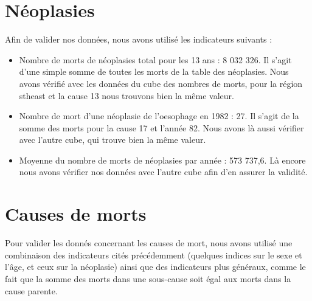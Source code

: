\section{Néoplasies}
Afin de valider nos données, nous avons utilisé les indicateurs suivants :
\begin{itemize}
    \item Nombre de morts de néoplasies total pour les 13 ans : 8 032 326. Il s'agit d'une simple somme de toutes les morts de la table des néoplasies. Nous avons vérifié avec les données du cube des nombres de morts, pour la région stheast et la cause 13 nous trouvons bien la même valeur.
    \item Nombre de mort d'une néoplasie de l'oesophage en 1982 : 27. Il s'agit de la somme des morts pour la cause 17 et l'année 82. Nous avons là aussi vérifier avec l'autre cube, qui trouve bien la même valeur.
    \item Moyenne du nombre de morts de néoplasies par année : 573 737,6. Là encore nous avons vérifier nos données avec l'autre cube afin d'en assurer la validité.
\end{itemize}

\section{Causes de morts}
Pour valider les donnés concernant les causes de mort, nous avons utilisé une combinaison des indicateurs cités précédemment (quelques indices sur le sexe
et l'âge, et ceux sur la néoplasie) ainsi que des indicateurs plus généraux, comme le fait que la somme des morts dans une sous-cause soit égal aux morts
dans la cause parente.

\pagebreak
